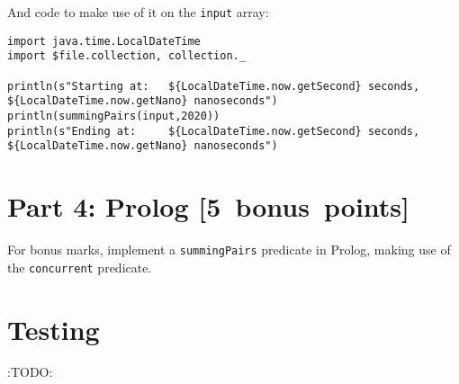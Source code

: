 \documentclass[11pt]{article}
\begin{document}
And code to make use of it on the \texttt{input} array:
\begin{verbatim}
import java.time.LocalDateTime
import $file.collection, collection._

println(s"Starting at:   ${LocalDateTime.now.getSecond} seconds, ${LocalDateTime.now.getNano} nanoseconds")
println(summingPairs(input,2020))
println(s"Ending at:     ${LocalDateTime.now.getSecond} seconds, ${LocalDateTime.now.getNano} nanoseconds")
\end{verbatim}

\section*{Part 4: Prolog  [5 bonus points]}
\label{sec:org536e8db}
For bonus marks, implement a \texttt{summingPairs} predicate in Prolog,
making use of the \texttt{concurrent} predicate.

\section*{Testing}
\label{sec:orge0743ff}
:TODO:
\end{document}
